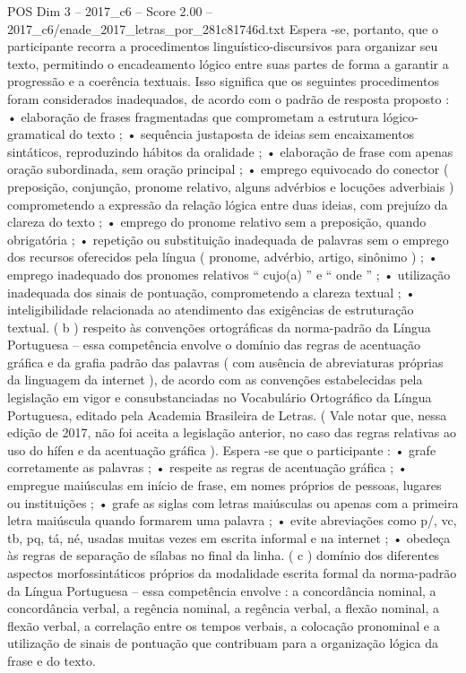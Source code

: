\begin{textsample}{POS Dim 3 – 2017\_c6 – Score 2.00 – 2017\_c6/enade\_2017\_letras\_por\_281c81746d.txt}
Espera -se, portanto, que o participante recorra a procedimentos linguístico-discursivos para organizar seu texto, permitindo o encadeamento lógico entre suas partes de forma a garantir a progressão e a coerência textuais.
Isso significa que os seguintes procedimentos foram considerados inadequados, de acordo com o padrão de resposta proposto : • elaboração de frases fragmentadas que comprometam a estrutura lógico-gramatical do texto ; • sequência justaposta de ideias sem encaixamentos sintáticos, reproduzindo hábitos da oralidade ; • elaboração de frase com apenas oração subordinada, sem oração principal ; • emprego equivocado do conector ( preposição, conjunção, pronome relativo, alguns advérbios e locuções adverbiais ) comprometendo a expressão da relação lógica entre duas ideias, com prejuízo da clareza do texto ; • emprego do pronome relativo sem a preposição, quando obrigatória ; • repetição ou substituição inadequada de palavras sem o emprego dos recursos oferecidos pela língua ( pronome, advérbio, artigo, sinônimo ) ; • emprego inadequado dos pronomes relativos “ cujo(a) ” e “ onde ” ; • utilização inadequada dos sinais de pontuação, comprometendo a clareza textual ; • inteligibilidade relacionada ao atendimento das exigências de estruturação textual. ( b ) respeito às convenções ortográficas da norma-padrão da Língua Portuguesa – essa competência envolve o domínio das regras de acentuação gráfica e da grafia padrão das palavras ( com ausência de abreviaturas próprias da linguagem da internet ), de acordo com as convenções estabelecidas pela legislação em vigor e consubstanciadas no Vocabulário Ortográfico da Língua Portuguesa, editado pela Academia Brasileira de Letras. ( Vale notar que, nessa edição de 2017, não foi aceita a legislação anterior, no caso das regras relativas ao uso do hífen e da acentuação gráfica ).
Espera -se que o participante : • grafe corretamente as palavras ; • respeite as regras de acentuação gráfica ; • empregue maiúsculas em início de frase, em nomes próprios de pessoas, lugares ou instituições ; • grafe as siglas com letras maiúsculas ou apenas com a primeira letra maiúscula quando formarem uma palavra ; • evite abreviações como p/, vc, tb, pq, tá, né, usadas muitas vezes em escrita informal e na internet ; • obedeça às regras de separação de sílabas no final da linha. ( c ) domínio dos diferentes aspectos morfossintáticos próprios da modalidade escrita formal da norma-padrão da Língua Portuguesa – essa competência envolve : a concordância nominal, a concordância verbal, a regência nominal, a regência verbal, a flexão nominal, a flexão verbal, a correlação entre os tempos verbais, a colocação pronominal e a utilização de sinais de pontuação que contribuam para a organização lógica da frase e do texto.

\end{textsample}
